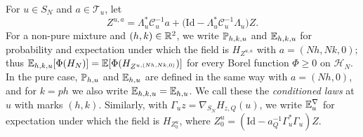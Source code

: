 \begin{definition}\label{def:kr-conditioned}
For $u\in S_N$ and $a\in \mathcal T_u$, let
\begin{equation}\label{eq:kr-regression}
Z^{u,a}=\Lambda_u^{*}\mathcal C_u^{-1}a+\big(\mathrm{Id}-\Lambda_u^{*}\mathcal C_u^{-1}\Lambda_u\big)Z.
\end{equation}
For a non-pure mixture and $(h,k)\in\mathbb R^2$, we write $\mathbb P_{h,k,u}$ and $\mathbb E_{h,k,u}$ for probability and expectation under which the field is $H_{Z^{u,a}}$ with $a=(Nh,Nk,0)$; thus $\mathbb E_{h,k,u}[\Phi(H_N)]=\mathbb E[\Phi(H_{Z^{u,(Nh,Nk,0)}})]$ for every Borel function $\Phi\ge0$ on $\mathcal H_N$. In the pure case, $\mathbb P_{h,u}$ and $\mathbb E_{h,u}$ are defined in the same way with $a=(Nh,0)$, and for $k=ph$ we also write $\mathbb E_{h,k,u}=\mathbb E_{h,u}$. We call these the \emph{conditioned laws} at $u$ with marks $(h,k)$. Similarly, with $\Gamma_uz=\nabla_{S_N}H_{z,Q}(u)$, we write $\mathbb E^{\nabla}_u$ for expectation under which the field is $H_{Z^u_0}$, where $Z^u_0=(\mathrm{Id}-a_Q^{-1}\Gamma_u^{*}\Gamma_u)Z$.
\end{definition}

